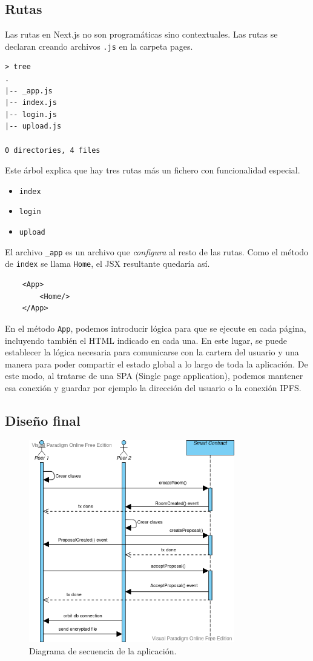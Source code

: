 \subsection{Rutas}
Las rutas en Next.js no son programáticas sino contextuales. Las rutas se declaran creando archivos \verb|.js| en la carpeta pages.
\begin{lstlisting}
> tree
.
|-- _app.js
|-- index.js
|-- login.js
|-- upload.js

0 directories, 4 files
\end{lstlisting}
Este árbol explica que hay tres rutas más un fichero con funcionalidad especial.
\begin{itemize}
    \item \verb|index|
    \item \verb|login|
    \item \verb|upload|
\end{itemize}
El archivo \verb|_app| es un archivo que \textit{configura} al resto de las rutas.
Como el método de \verb|index| se llama \verb|Home|, el JSX resultante quedaría así.
\begin{lstlisting}
    <App>
        <Home/>
    </App>
\end{lstlisting}
En el método \verb|App|, podemos introducir lógica para que se ejecute en cada página, incluyendo también el HTML indicado en cada una. En este lugar, se puede establecer la lógica necesaria para comunicarse con la cartera del usuario y una manera para poder compartir el estado global a lo largo de toda la aplicación.
De este modo, al tratarse de una SPA \cite{web:spa} (Single page application), podemos mantener esa conexión y guardar por ejemplo la dirección del usuario o la conexión IPFS.
\newpage
\subsection{Diseño final}
\begin{figure}[H]
    \centering
    \includegraphics[width=0.8\textwidth]{Figures/Secuencia 1.png}
    \caption{Diagrama de secuencia de la aplicación.}
\end{figure}
\newpage
